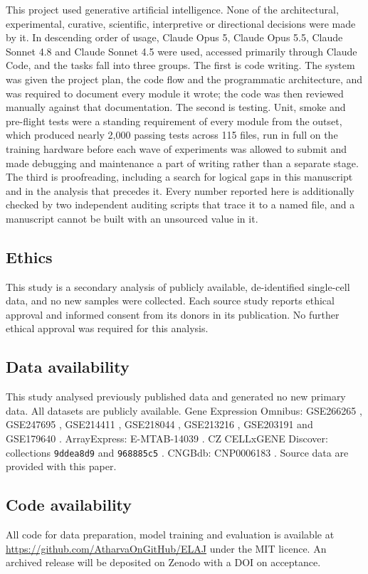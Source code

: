 This project used generative artificial intelligence. None of the
architectural, experimental, curative, scientific, interpretive or
directional decisions were made by it. In descending order of usage, Claude
Opus 5, Claude Opus 5.5, Claude Sonnet 4.8 and Claude Sonnet 4.5 were used, accessed
primarily through Claude Code, and the tasks fall into three groups. The
first is code writing. The system was given the project plan, the code flow
and the programmatic architecture, and was required to document every module
it wrote; the code was then reviewed manually against that documentation.
The second is testing. Unit, smoke and pre-flight tests were a standing
requirement of every module from the outset, which produced nearly 2{,}000 passing
tests across 115 files, run in full on the training hardware before each
wave of experiments was allowed to submit and made debugging and maintenance a part of writing rather
than a separate stage. The third is proofreading, including a search for
logical gaps in this manuscript and in the analysis that precedes it. Every
number reported here is additionally checked by two independent auditing
scripts that trace it to a named file, and a manuscript cannot be built with
an unsourced value in it.

\subsection*{Ethics}

This study is a secondary analysis of publicly available, de-identified
single-cell data, and no new samples were collected. Each source study
reports ethical approval and informed consent from its donors in its
publication. No further ethical approval was required for this analysis.

\subsection*{Data availability}

This study analysed previously published data and generated no new primary
data. All datasets are publicly available. Gene Expression Omnibus:
GSE266265 \citep{duempelmann2026endometrium}, GSE247695 \citep{sarsenova2024metabolic},
GSE214411 \citep{huang2023immune}, GSE218044 \citep{chen2022adenomyosis},
GSE213216 \citep{fonseca2023endometriosis}, GSE203191
\citep{shih2022menstrual} and GSE179640 \citep{tan2022singlecell}.
ArrayExpress: E-MTAB-14039 \citep{mareckova2024heca}. CZ CELLxGENE
Discover: collections \texttt{9ddea8d9} and \texttt{968885c5}
\citep{garciaalonso2021endometrium}. CNGBdb: CNP0006183
\citep{li2025iron}. Source data are provided with this paper.


\subsection*{Code availability}

All code for data preparation, model training and evaluation is available at
\url{https://github.com/AtharvaOnGitHub/ELAJ} under the MIT licence. An
archived release will be deposited on Zenodo with a DOI on acceptance.

